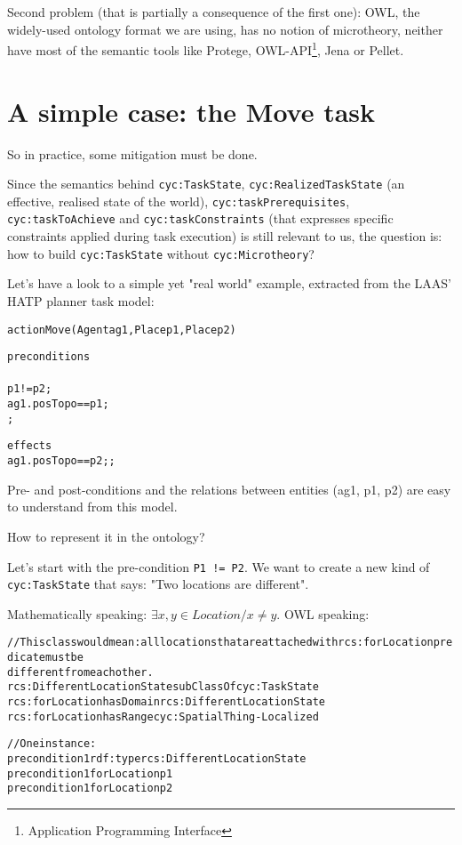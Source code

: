 Second problem (that is partially a consequence of the first one): OWL, the
widely-used ontology format we are using, has no notion of microtheory, neither
have most of the semantic tools like Protege, OWL-API\footnote{Application
Programming Interface}, Jena or Pellet.


\section{A simple case: the Move task}

So in practice, some mitigation must be done.

Since the semantics behind {\tt cyc:TaskState}, {\tt cyc:RealizedTaskState} (an
effective, realised state of the world), {\tt cyc:taskPrerequisites}, {\tt
cyc:taskToAchieve} and {\tt cyc:taskConstraints} (that expresses specific
constraints applied during task execution) is still relevant to us, the
question is: how to build {\tt cyc:TaskState} without {\tt cyc:Microtheory}?

Let's have a look to a simple yet "real world" example, extracted from the
LAAS' HATP planner task model:



\begin{alltt}

action Move(Agent ag1, Place p1, Place p2)
 {
   preconditions
   {
     p1 != p2;
     ag1.posTopo == p1;
   };

   effects
   { ag1.posTopo == p2; };
 } 

\end{alltt}

Pre- and post-conditions and the relations between entities (ag1, p1, p2) are
easy to understand from this model.

How to represent it in the ontology?

Let's start with the pre-condition {\tt P1 != P2}. We want to create a new kind
of {\tt cyc:TaskState} that says: "Two locations are different".

Mathematically speaking: $ \exists x,y \in Location / x \neq y$. OWL speaking:



\begin{alltt}

//This class would mean: all locations that are attached with rcs:forLocation predicate must be
different from each other.
rcs:DifferentLocationState subClassOf cyc:TaskState
rcs:forLocation hasDomain rcs:DifferentLocationState
rcs:forLocation hasRange cyc:SpatialThing-Localized

//One instance:
precondition1 rdf:type rcs:DifferentLocationState
precondition1 forLocation p1
precondition1 forLocation p2

\end{alltt}

